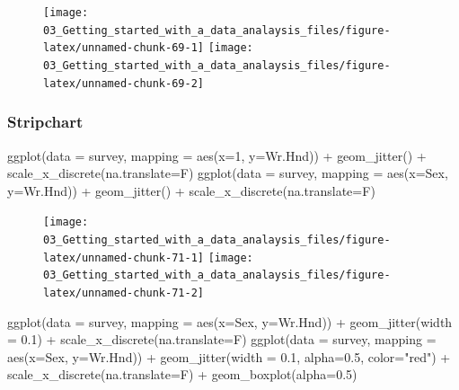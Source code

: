 \documentclass[
]{book}
\newenvironment{Shaded}{\begin{snugshade}}{\end{snugshade}}
\newcommand{\AttributeTok}[1]{\textcolor[rgb]{0.77,0.63,0.00}{#1}}
\newcommand{\DecValTok}[1]{\textcolor[rgb]{0.00,0.00,0.81}{#1}}
\newcommand{\FloatTok}[1]{\textcolor[rgb]{0.00,0.00,0.81}{#1}}
\newcommand{\FunctionTok}[1]{\textcolor[rgb]{0.00,0.00,0.00}{#1}}
\newcommand{\NormalTok}[1]{#1}
\newcommand{\SpecialCharTok}[1]{\textcolor[rgb]{0.00,0.00,0.00}{#1}}
\newcommand{\StringTok}[1]{\textcolor[rgb]{0.31,0.60,0.02}{#1}}
\begin{document}
\begin{figure}
\texttt{[image: 03\_Getting\_started\_with\_a\_data\_analaysis\_files/figure-latex/unnamed-chunk-69-1]} \texttt{[image: 03\_Getting\_started\_with\_a\_data\_analaysis\_files/figure-latex/unnamed-chunk-69-2]} \end{figure}

\hypertarget{stripchart}{%
\subsubsection{Stripchart}\label{stripchart}}

\begin{Shaded}
\begin{Highlighting}[]
\FunctionTok{ggplot}\NormalTok{(}\AttributeTok{data =}\NormalTok{ survey, }\AttributeTok{mapping =} \FunctionTok{aes}\NormalTok{(}\AttributeTok{x=}\DecValTok{1}\NormalTok{, }\AttributeTok{y=}\NormalTok{Wr.Hnd)) }\SpecialCharTok{+} 
  \FunctionTok{geom\_jitter}\NormalTok{() }\SpecialCharTok{+} \FunctionTok{scale\_x\_discrete}\NormalTok{(}\AttributeTok{na.translate=}\NormalTok{F) }
\FunctionTok{ggplot}\NormalTok{(}\AttributeTok{data =}\NormalTok{ survey, }\AttributeTok{mapping =} \FunctionTok{aes}\NormalTok{(}\AttributeTok{x=}\NormalTok{Sex, }\AttributeTok{y=}\NormalTok{Wr.Hnd)) }\SpecialCharTok{+} 
  \FunctionTok{geom\_jitter}\NormalTok{() }\SpecialCharTok{+} \FunctionTok{scale\_x\_discrete}\NormalTok{(}\AttributeTok{na.translate=}\NormalTok{F)}
\end{Highlighting}
\end{Shaded}

\begin{figure}
\texttt{[image: 03\_Getting\_started\_with\_a\_data\_analaysis\_files/figure-latex/unnamed-chunk-71-1]} \texttt{[image: 03\_Getting\_started\_with\_a\_data\_analaysis\_files/figure-latex/unnamed-chunk-71-2]} \end{figure}

\begin{Shaded}
\begin{Highlighting}[]
\FunctionTok{ggplot}\NormalTok{(}\AttributeTok{data =}\NormalTok{ survey, }\AttributeTok{mapping =} \FunctionTok{aes}\NormalTok{(}\AttributeTok{x=}\NormalTok{Sex, }\AttributeTok{y=}\NormalTok{Wr.Hnd)) }\SpecialCharTok{+} 
  \FunctionTok{geom\_jitter}\NormalTok{(}\AttributeTok{width =} \FloatTok{0.1}\NormalTok{) }\SpecialCharTok{+} \FunctionTok{scale\_x\_discrete}\NormalTok{(}\AttributeTok{na.translate=}\NormalTok{F) }
\FunctionTok{ggplot}\NormalTok{(}\AttributeTok{data =}\NormalTok{ survey, }\AttributeTok{mapping =} \FunctionTok{aes}\NormalTok{(}\AttributeTok{x=}\NormalTok{Sex, }\AttributeTok{y=}\NormalTok{Wr.Hnd)) }\SpecialCharTok{+} 
  \FunctionTok{geom\_jitter}\NormalTok{(}\AttributeTok{width =} \FloatTok{0.1}\NormalTok{, }\AttributeTok{alpha=}\FloatTok{0.5}\NormalTok{, }\AttributeTok{color=}\StringTok{"red"}\NormalTok{) }\SpecialCharTok{+} 
  \FunctionTok{scale\_x\_discrete}\NormalTok{(}\AttributeTok{na.translate=}\NormalTok{F) }\SpecialCharTok{+}
  \FunctionTok{geom\_boxplot}\NormalTok{(}\AttributeTok{alpha=}\FloatTok{0.5}\NormalTok{)}
\end{Highlighting}
\end{Shaded}
\end{document}
